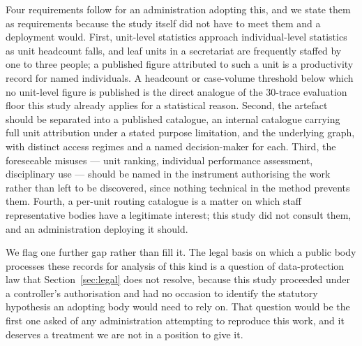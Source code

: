 Four requirements follow for an administration adopting this, and we state them as requirements
because the study itself did not have to meet them and a deployment would. First, unit-level
statistics approach individual-level statistics as unit headcount falls, and leaf units in a
secretariat are frequently staffed by one to three people; a published figure attributed to such
a unit is a productivity record for named individuals. A headcount or case-volume threshold
below which no unit-level figure is published is the direct analogue of the 30-trace evaluation
floor this study already applies for a statistical reason. Second, the artefact should be
separated into a published catalogue, an internal catalogue carrying full unit attribution under
a stated purpose limitation, and the underlying graph, with distinct access regimes and a named
decision-maker for each. Third, the foreseeable misuses --- unit ranking, individual performance
assessment, disciplinary use --- should be named in the instrument authorising the work rather
than left to be discovered, since nothing technical in the method prevents them. Fourth, a
per-unit routing catalogue is a matter on which staff representative bodies have a legitimate
interest; this study did not consult them, and an administration deploying it should.

We flag one further gap rather than fill it. The legal basis on which a public body processes
these records for analysis of this kind is a question of data-protection law that
Section~\ref{sec:legal} does not resolve, because this study proceeded under a controller's
authorisation and had no occasion to identify the statutory hypothesis an adopting body would
need to rely on. That question would be the first one asked of any administration attempting to
reproduce this work, and it deserves a treatment we are not in a position to give it.
